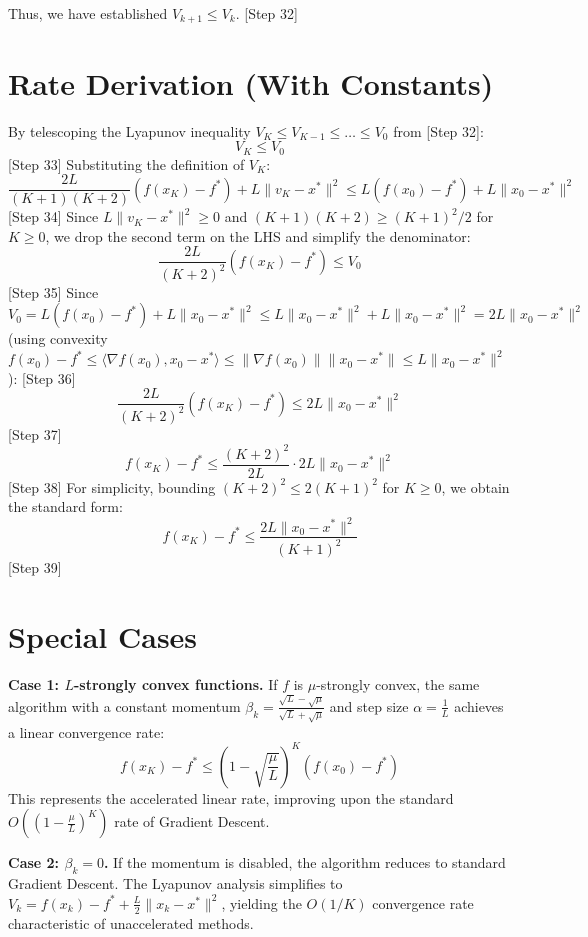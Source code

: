 \documentclass{article}
\begin{document}
Thus, we have established $V_{k+1} \leq V_k$. [Step 32]

\section*{Rate Derivation (With Constants)}
By telescoping the Lyapunov inequality $V_K \leq V_{K-1} \leq \dots \leq V_0$ from [Step 32]:
$$V_K \leq V_0$$ [Step 33]
Substituting the definition of $V_K$:
$$\frac{2L}{(K+1)(K+2)} (f(x_K) - f^*) + L \|v_K - x^*\|^2 \leq L(f(x_0) - f^*) + L\|x_0 - x^*\|^2$$ [Step 34]
Since $L \|v_K - x^*\|^2 \geq 0$ and $(K+1)(K+2) \geq (K+1)^2 / 2$ for $K \geq 0$, we drop the second term on the LHS and simplify the denominator:
$$\frac{2L}{(K+2)^2} (f(x_K) - f^*) \leq V_0$$ [Step 35]
Since $V_0 = L(f(x_0) - f^*) + L\|x_0 - x^*\|^2 \leq L\|x_0 - x^*\|^2 + L\|x_0 - x^*\|^2 = 2L\|x_0 - x^*\|^2$ (using convexity $f(x_0) - f^* \leq \langle \nabla f(x_0), x_0 - x^* \rangle \leq \|\nabla f(x_0)\|\|x_0 - x^*\| \leq L\|x_0 - x^*\|^2$): [Step 36]
$$\frac{2L}{(K+2)^2} (f(x_K) - f^*) \leq 2L \|x_0 - x^*\|^2$$ [Step 37]
$$f(x_K) - f^* \leq \frac{(K+2)^2}{2L} \cdot 2L \|x_0 - x^*\|^2$$ [Step 38]
For simplicity, bounding $(K+2)^2 \leq 2(K+1)^2$ for $K \geq 0$, we obtain the standard form:
$$f(x_K) - f^* \leq \frac{2L \|x_0 - x^*\|^2}{(K+1)^2}$$ [Step 39]

\section*{Special Cases}
\textbf{Case 1: $L$-strongly convex functions.}
If $f$ is $\mu$-strongly convex, the same algorithm with a constant momentum $\beta_k = \frac{\sqrt{L} - \sqrt{\mu}}{\sqrt{L} + \sqrt{\mu}}$ and step size $\alpha = \frac{1}{L}$ achieves a linear convergence rate:
$$f(x_K) - f^* \leq \left(1 - \sqrt{\frac{\mu}{L}}\right)^K (f(x_0) - f^*)$$
This represents the accelerated linear rate, improving upon the standard $O\left(\left(1 - \frac{\mu}{L}\right)^K\right)$ rate of Gradient Descent.

\textbf{Case 2: $\beta_k = 0$.}
If the momentum is disabled, the algorithm reduces to standard Gradient Descent. The Lyapunov analysis simplifies to $V_k = f(x_k) - f^* + \frac{L}{2}\|x_k - x^*\|^2$, yielding the $O(1/K)$ convergence rate characteristic of unaccelerated methods.
\end{document}
